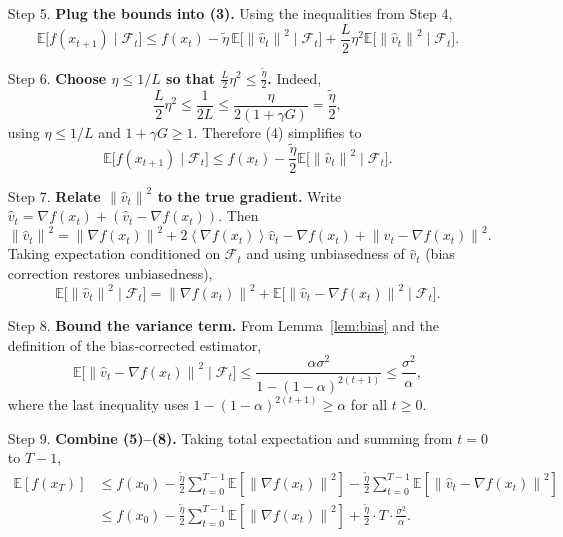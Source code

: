 \documentclass{article}
\newcommand{\E}{\mathbb{E}}
\newcommand{\norm}[1]{\left\|#1\right\|}
\newcommand{\inner}[1]{\left\langle#1\right\rangle}
\begin{document}
\begin{enumerate}
\item[Step 5.] \textbf{Plug the bounds into (3).}
Using the inequalities from Step 4,
\[
\E\bigl[f(x_{t+1})\mid\mathcal{F}_{t}\bigr]
\le f(x_{t}) -\tilde\eta\,\E\bigl[\norm{\hat v_{t}}^{2}\mid\mathcal{F}_{t}\bigr]
+\frac{L}{2}\eta^{2}\E\bigl[\norm{\hat v_{t}}^{2}\mid\mathcal{F}_{t}\bigr]. \tag{4}
\]

\item[Step 6.] \textbf{Choose $\eta\le 1/L$ so that $ \frac{L}{2}\eta^{2}\le \frac{\tilde\eta}{2}$.}
Indeed,
\[
\frac{L}{2}\eta^{2}\le\frac{1}{2L}\le\frac{\eta}{2(1+\gamma G)}=\frac{\tilde\eta}{2},
\]
using $\eta\le 1/L$ and $1+\gamma G\ge1$. Therefore (4) simplifies to
\[
\E\bigl[f(x_{t+1})\mid\mathcal{F}_{t}\bigr]
\le f(x_{t})-\frac{\tilde\eta}{2}\E\bigl[\norm{\hat v_{t}}^{2}\mid\mathcal{F}_{t}\bigr]. \tag{5}
\]

\item[Step 7.] \textbf{Relate $\norm{\hat v_{t}}^{2}$ to the true gradient.}
Write $\hat v_{t}= \nabla f(x_{t})+(\hat v_{t}-\nabla f(x_{t}))$. Then
\[
\norm{\hat v_{t}}^{2}= \norm{\nabla f(x_{t})}^{2}
+2\inner{\nabla f(x_{t})}{\hat v_{t}-\nabla f(x_{t})}
+\norm{\hat v_{t}-\nabla f(x_{t})}^{2}.
\]
Taking expectation conditioned on $\mathcal{F}_{t}$ and using unbiasedness of $\hat v_{t}$ (bias correction restores unbiasedness),
\[
\E\bigl[\norm{\hat v_{t}}^{2}\mid\mathcal{F}_{t}\bigr]
= \norm{\nabla f(x_{t})}^{2}+ \E\bigl[\norm{\hat v_{t}-\nabla f(x_{t})}^{2}\mid\mathcal{F}_{t}\bigr]. \tag{6}
\]

\item[Step 8.] \textbf{Bound the variance term.}
From Lemma~\ref{lem:bias} and the definition of the bias‑corrected estimator,
\[
\E\bigl[\norm{\hat v_{t}-\nabla f(x_{t})}^{2}\mid\mathcal{F}_{t}\bigr]
\le \frac{\alpha\sigma^{2}}{1-(1-\alpha)^{2(t+1)}}\le\frac{\sigma^{2}}{\alpha},
\]
where the last inequality uses $1-(1-\alpha)^{2(t+1)}\ge\alpha$ for all $t\ge0$.

\item[Step 9.] \textbf{Combine (5)–(8).}
Taking total expectation and summing from $t=0$ to $T-1$,
\[
\begin{aligned}
\E[f(x_{T})]
&\le f(x_{0})-\frac{\tilde\eta}{2}\sum_{t=0}^{T-1}\E\!\left[\norm{\nabla f(x_{t})}^{2}\right]
-\frac{\tilde\eta}{2}\sum_{t=0}^{T-1}\E\!\left[\norm{\hat v_{t}-\nabla f(x_{t})}^{2}\right] \\
&\le f(x_{0})-\frac{\tilde\eta}{2}\sum_{t=0}^{T-1}\E\!\left[\norm{\nabla f(x_{t})}^{2}\right]
+\frac{\tilde\eta}{2}\cdot T\cdot\frac{\sigma^{2}}{\alpha}.
\end{aligned}
\tag{7}
\]


\end{enumerate}
\end{document}
